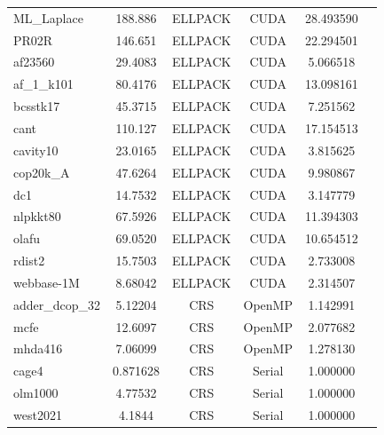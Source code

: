 \documentclass[12pt,oneside]{book} %
\begin{document}
\begin{longtable}{lccccr}
    ML\_Laplace       & 188.886                   & ELLPACK                 & CUDA                 & 28.493590        \\
    PR02R             & 146.651                   & ELLPACK                 & CUDA                 & 22.294501        \\
    af23560           & 29.4083                   & ELLPACK                 & CUDA                 & 5.066518         \\
    af\_1\_k101       & 80.4176                   & ELLPACK                 & CUDA                 & 13.098161        \\
    bcsstk17          & 45.3715                   & ELLPACK                 & CUDA                 & 7.251562         \\
    cant              & 110.127                   & ELLPACK                 & CUDA                 & 17.154513        \\
    cavity10          & 23.0165                   & ELLPACK                 & CUDA                 & 3.815625         \\
    cop20k\_A         & 47.6264                   & ELLPACK                 & CUDA                 & 9.980867         \\
    dc1               & 14.7532                   & ELLPACK                 & CUDA                 & 3.147779         \\
    nlpkkt80          & 67.5926                   & ELLPACK                 & CUDA                 & 11.394303        \\
    olafu             & 69.0520                   & ELLPACK                 & CUDA                 & 10.654512        \\
    rdist2            & 15.7503                   & ELLPACK                 & CUDA                 & 2.733008         \\
    webbase-1M        & 8.68042                   & ELLPACK                 & CUDA                 & 2.314507         \\
    adder\_dcop\_32   & 5.12204                   & CRS                     & OpenMP               & 1.142991         \\
    mcfe              & 12.6097                   & CRS                     & OpenMP               & 2.077682         \\
    mhda416           & 7.06099                   & CRS                     & OpenMP               & 1.278130         \\
    cage4             & 0.871628                  & CRS                     & Serial               & 1.000000         \\
    olm1000           & 4.77532                   & CRS                     & Serial               & 1.000000         \\
    west2021          & 4.1844                    & CRS                     & Serial               & 1.000000         \\
\end{longtable}
\end{document}
